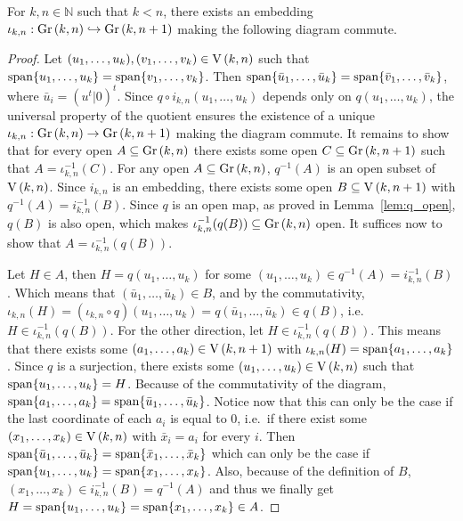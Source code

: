 \begin{proposition}\label{prop:gr_embedding} For $k,n\in\mathbb{N}$ such that $k<n$, there exists an embedding $\iota_{k,n}:\Gr{k}{n}\hookrightarrow\Gr{k}{n+1}$ making the following diagram commute.
\begin{center}
\end{center}
\end{proposition}
\begin{proof} Let $(u_1,\ldots,u_k),(v_1,\ldots,v_k)\in\St{k}{n}$ such that $\mathrm{span}\{u_1,\ldots,u_k\}=\mathrm{span}\{v_1,\ldots,v_k\}$. Then $\mathrm{span}\{\bar{u}_1,\ldots,\bar{u}_k\}=\mathrm{span}\{\bar{v}_1,\ldots,\bar{v}_k\}$, where $\bar{u}_i=(u^t|0)^t$. Since $q\circ i_{k,n}(u_1,\ldots,u_k)$ depends only on $q(u_1,\ldots,u_k)$, the universal property of the quotient ensures the existence of a unique $\iota_{k,n}:\Gr{k}{n}\to\Gr{k}{n+1}$ making the diagram commute. It remains to show that for every open $A\subseteq\Gr{k}{n}$ there exists some open $C\subseteq\Gr{k}{n+1}$ such that $A=\iota_{k,n}^{-1}(C)$. For any open $A\subseteq\Gr{k}{n}$, $q^{-1}(A)$ is an open subset of $\St{k}{n}$. Since $i_{k,n}$ is an embedding, there exists some open $B\subseteq\St{k}{n+1}$ with $q^{-1}(A)=i_{k,n}^{-1}(B)$. Since $q$ is an open map, as proved in Lemma~\ref{lem:q_open}, $q(B)$ is also open, which makes $\iota_{k,n}^{-1}(q(B))\subseteq\Gr{k}{n}$ open. It suffices now to show that $A=\iota_{k,n}^{-1}(q(B))$.

Let $H\in A$, then $H=q(u_1,\ldots,u_k)$ for some $(u_1,\ldots,u_k)\in q^{-1}(A)=i_{k,n}^{-1}(B)$. Which means that $(\bar{u}_1,\ldots,\bar{u}_k)\in B$, and by the commutativity, $\iota_{k,n}(H)=(\iota_{k,n}\circ q)(u_1,\ldots,u_k)=q(\bar{u}_1,\ldots,\bar{u}_k)\in q(B)$, i.e.\ $H\in\iota_{k,n}^{-1}(q(B))$. For the other direction, let $H\in\iota_{k,n}^{-1}(q(B))$. This means that there exists some $(a_1,\ldots,a_k)\in\St{k}{n+1}$ with $\iota_{k,n}(H)=\mathrm{span}\{a_1,\ldots,a_k\}$. Since $q$ is a surjection, there exists some $(u_1,\ldots,u_k)\in\St{k}{n}$ such that $\mathrm{span}\{u_1,\ldots,u_k\}=H$. Because of the commutativity of the diagram, $\mathrm{span}\{a_1,\ldots,a_k\}=\mathrm{span}\{\bar{u}_1,\ldots,\bar{u}_k\}$. Notice now that this can only be the case if the last coordinate of each $a_i$ is equal to $0$, i.e.\ if there exist some $(x_1,\ldots,x_k)\in\St{k}{n}$ with $\bar{x}_i=a_i$ for every $i$. Then $\mathrm{span}\{\bar{u}_1,\ldots,\bar{u}_k\}=\mathrm{span}\{\bar{x}_1,\ldots,\bar{x}_k\}$ which can only be the case if $\mathrm{span}\{u_1,\ldots,u_k\}=\mathrm{span}\{x_1,\ldots,x_k\}$. Also, because of the definition of $B$, $(x_1,\ldots,x_k)\in i_{k,n}^{-1}(B)=q^{-1}(A)$ and thus we finally get $H=\mathrm{span}\{u_1,\ldots,u_k\}=\mathrm{span}\{x_1,\ldots,x_k\}\in A$.
\end{proof}
